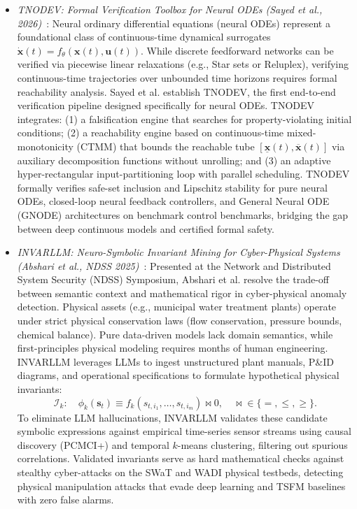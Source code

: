 \begin{itemize}[leftmargin=*]
    \item \emph{TNODEV: Formal Verification Toolbox for Neural ODEs (Sayed et al., 2026)}~\cite{sayed2026tnodev}: Neural ordinary differential equations (neural ODEs) represent a foundational class of continuous-time dynamical surrogates $\dot{\mathbf{x}}(t) = f_\theta(\mathbf{x}(t), \mathbf{u}(t))$. While discrete feedforward networks can be verified via piecewise linear relaxations (e.g., Star sets or Reluplex), verifying continuous-time trajectories over unbounded time horizons requires formal reachability analysis. Sayed et al. establish TNODEV, the first end-to-end verification pipeline designed specifically for neural ODEs. TNODEV integrates:
    (1) a falsification engine that searches for property-violating initial conditions;
    (2) a reachability engine based on continuous-time mixed-monotonicity (CTMM) that bounds the reachable tube $[\underline{\mathbf{x}}(t), \overline{\mathbf{x}}(t)]$ via auxiliary decomposition functions without unrolling; and
    (3) an adaptive hyper-rectangular input-partitioning loop with parallel scheduling.
    TNODEV formally verifies safe-set inclusion and Lipschitz stability for pure neural ODEs, closed-loop neural feedback controllers, and General Neural ODE (GNODE) architectures on benchmark control benchmarks, bridging the gap between deep continuous models and certified formal safety.

    \item \emph{INVARLLM: Neuro-Symbolic Invariant Mining for Cyber-Physical Systems (Abshari et al., NDSS 2025)}~\cite{abshari2025invarllm}: Presented at the Network and Distributed System Security (NDSS) Symposium, Abshari et al. resolve the trade-off between semantic context and mathematical rigor in cyber-physical anomaly detection. Physical assets (e.g., municipal water treatment plants) operate under strict physical conservation laws (flow conservation, pressure bounds, chemical balance). Pure data-driven models lack domain semantics, while first-principles physical modeling requires months of human engineering. INVARLLM leverages LLMs to ingest unstructured plant manuals, P\&ID diagrams, and operational specifications to formulate hypothetical physical invariants:
    \begin{equation}
        \mathcal{I}_k: \quad \phi_k(\mathbf{s}_t) \equiv f_k(s_{t, i_1}, \dots, s_{t, i_m}) \bowtie 0, \quad \bowtie \in \{=, \le, \ge\}.
    \end{equation}
    To eliminate LLM hallucinations, INVARLLM validates these candidate symbolic expressions against empirical time-series sensor streams using causal discovery (PCMCI+) and temporal $k$-means clustering, filtering out spurious correlations. Validated invariants serve as hard mathematical checks against stealthy cyber-attacks on the SWaT and WADI physical testbeds, detecting physical manipulation attacks that evade deep learning and TSFM baselines with zero false alarms.


\end{itemize}
